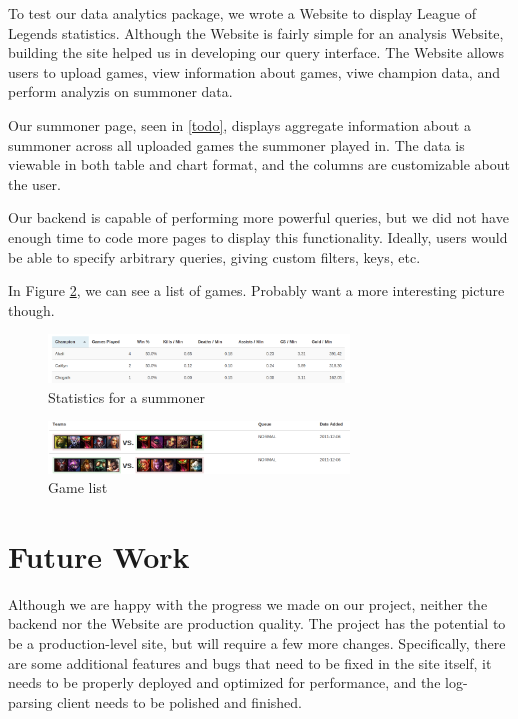 \documentclass[letterpaper,twocolumn,9pt]{article}
\begin{document}
To test our data analytics package, we wrote a Website to display League of Legends statistics. Although the Website is fairly simple for an analysis Website, building the site helped us in developing our query interface. The Website allows users to upload games, view information about games, viwe champion data, and perform analyzis on summoner data.

Our summoner page, seen in \ref{todo}, displays aggregate information about a summoner across all uploaded games the summoner played in. The data is viewable in both table and chart format, and the columns are customizable about the user.

Our backend is capable of performing more powerful queries, but we did not have enough time to code more pages to display this functionality. Ideally, users would be able to specify arbitrary queries, giving custom filters, keys, etc. 

In Figure \ref{list}, we can see a list of games. Probably want a more interesting picture though.

\begin{figure}[h]
    \includegraphics[width=80mm]{imgs/stats.png}
    \caption{Statistics for a summoner}
    \label{chart}
\end{figure}

\begin{figure}[h]
    \includegraphics[width=80mm]{imgs/gamelist.png}
    \caption{Game list}
    \label{list}
\end{figure}

\section{Future Work}
\label{future}

Although we are happy with the progress we made on our project, neither the backend nor the Website are production quality.   The project has the potential to be a production-level site, but will require a few more changes.  Specifically, there are some additional features and bugs that need to be fixed in the site itself, it needs to be properly deployed and optimized for performance, and the log-parsing client needs to be polished and finished.
\end{document}
